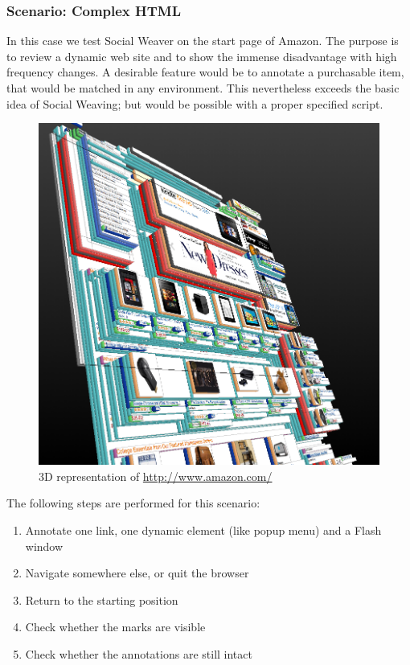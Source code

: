 \subsubsection{Scenario: Complex HTML}
In this case we test Social Weaver on the start page of Amazon. The purpose is to review a dynamic web site and to show the immense disadvantage with high frequency changes. A desirable feature would be to annotate a purchasable item, that would be matched in any environment. This nevertheless exceeds the basic idea of Social Weaving; but would be possible with a proper specified script. 

\begin{figure}\centering
		\includegraphics[width=13cm]{images/3d-amazon.png}
		\caption{3D representation of \url{http://www.amazon.com/}}
		\label{3d-amazon}
\end{figure} 

The following steps are performed for this scenario:
\begin{enumerate}
\item Annotate one link, one dynamic element (like popup menu) and a Flash window
\item Navigate somewhere else, or quit the browser
\item Return to the starting position
\item Check whether the marks are visible
\item Check whether the annotations are still intact
\end{enumerate}

